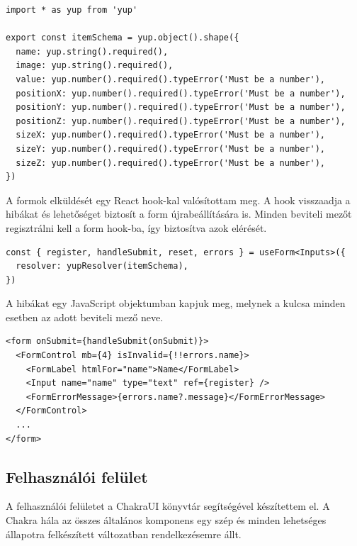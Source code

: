 \begin{lstlisting}[style=ES6, caption={Esköz validációs séma}]
import * as yup from 'yup'

export const itemSchema = yup.object().shape({
  name: yup.string().required(),
  image: yup.string().required(),
  value: yup.number().required().typeError('Must be a number'),
  positionX: yup.number().required().typeError('Must be a number'),
  positionY: yup.number().required().typeError('Must be a number'),
  positionZ: yup.number().required().typeError('Must be a number'),
  sizeX: yup.number().required().typeError('Must be a number'),
  sizeY: yup.number().required().typeError('Must be a number'),
  sizeZ: yup.number().required().typeError('Must be a number'),
})
\end{lstlisting}

A formok elküldését egy React hook-kal valósítottam meg.
A hook visszaadja a hibákat és lehetőséget biztosít a form újrabeállítására is.
Minden beviteli mezőt regisztrálni kell a form hook-ba, így biztosítva azok elérését.

\begin{lstlisting}[style=ES6, caption={Regisztrációnál használt form hook}]
const { register, handleSubmit, reset, errors } = useForm<Inputs>({
  resolver: yupResolver(itemSchema),
})
\end{lstlisting}

A hibákat egy JavaScript objektumban kapjuk meg, melynek a kulcsa minden esetben az adott beviteli mező neve.

\begin{lstlisting}[style=ES6, caption={Form}]
<form onSubmit={handleSubmit(onSubmit)}>
  <FormControl mb={4} isInvalid={!!errors.name}>
    <FormLabel htmlFor="name">Name</FormLabel>
    <Input name="name" type="text" ref={register} />
    <FormErrorMessage>{errors.name?.message}</FormErrorMessage>
  </FormControl>
  ...
</form>
\end{lstlisting}


\subsection{Felhasználói felület}
A felhasználói felületet a ChakraUI könyvtár segítségével készítettem el.
A Chakra hála az összes általános komponens egy szép és minden lehetséges állapotra felkészített változatban rendelkezésemre állt.

